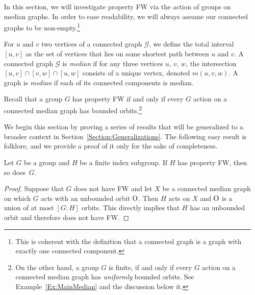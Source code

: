 \label{Section:Median}
In this section, we will investigate property FW via the action of groups on median graphs.
In order to ease readability, we will always assume our connected graphs to be non-empty.\footnote{This is coherent with the definition that a connected graph is a graph with exactly one connected component.}

For $u$ and $v$ two vertices of a connected graph $\mathcal G$, we define the total interval $[u,v]$ as the set of vertices that lies on some shortest path between $u$ and $v$.
A connected graph $\mathcal G$ is \emph{median} if for any three vertices $u$, $v$, $w$, the intersection $[u,v]\cap[v,w]\cap[u,w]$ consists of a unique vertex, denoted $m(u,v,w)$.
A graph is \emph{median} if each of its connected components is median.

Recall that a group $G$ has property FW if and only if every $G$ action on a connected median graph has bounded orbits.\footnote{On the other hand, a group $G$ is finite, if and only if every $G$ action on a connected median graph has \emph{uniformly} bounded orbits. See Example~\ref{Ex:MainMedian} and the discussion below it.}

We begin this section by proving a series of results that will be generalized to a broader context in Section~\ref{Section:Generalizations}.
The following easy result is folklore, and we provide a proof of it only for the sake of completeness.
\begin{lem}\label{Lemma:Subgroup}
Let $G$ be a group and $H$ be a finite index subgroup.
If $H$ has property FW, then so does~$G$.
\end{lem}
\begin{proof}
Suppose that $G$ does not have FW and let $X$ be a connected median graph on which $G$ acts with an unbounded orbit $\operatorname{O}$.
Then $H$ acts on $X$ and $\operatorname{O}$ is a union of at most $[G:H]$ orbits. This directly implies that $H$ has an unbounded orbit and therefore does not have FW.
\end{proof}

